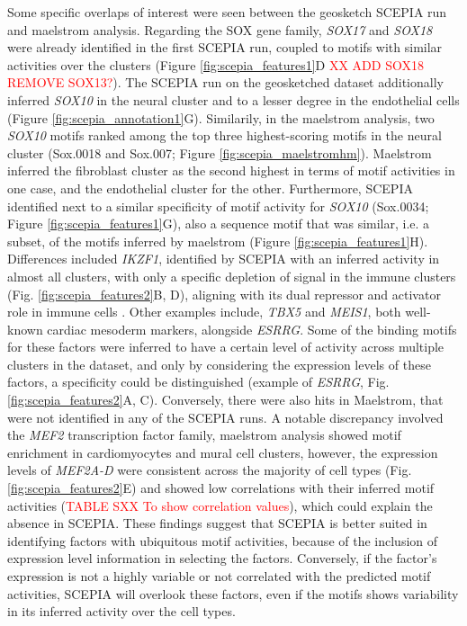 Some specific overlaps of interest were seen between the geosketch SCEPIA run and maelstrom analysis. Regarding the SOX gene family, \textit{SOX17} and \textit{SOX18} were already identified in the first SCEPIA run, coupled to motifs with similar activities over the clusters (Figure \ref{fig:scepia_features1}D \textcolor{red}{XX ADD SOX18 REMOVE SOX13?}). The SCEPIA run on the geosketched dataset additionally inferred \textit{SOX10} in the neural cluster and to a lesser degree in the endothelial cells (Figure \ref{fig:scepia_annotation1}G). Similarily, in the maelstrom analysis, two \textit{SOX10} motifs ranked among the top three highest-scoring motifs in the neural cluster (Sox.0018 and Sox.007; Figure \ref{fig:scepia_maelstromhm}). Maelstrom inferred the fibroblast cluster as the second highest in terms of motif activities in one case, and the endothelial cluster for the other. Furthermore, SCEPIA identified next to a similar specificity of motif activity for \textit{SOX10} (Sox.0034; Figure \ref{fig:scepia_features1}G), also a sequence motif that was similar, i.e. a subset, of the motifs inferred by maelstrom (Figure \ref{fig:scepia_features1}H). Differences included \textit{IKZF1}, identified by SCEPIA with an inferred activity in almost all clusters, with only a specific depletion of signal in the immune clusters (Fig. \ref{fig:scepia_features2}B, D), aligning with its dual repressor and activator role in immune cells \cite{Marke2018}. Other examples include, \textit{TBX5} and \textit{MEIS1}, both well-known cardiac mesoderm markers, alongside \textit{ESRRG}. Some of the binding motifs for these factors were inferred to have a certain level of activity across multiple clusters in the dataset, and only by considering the expression levels of these factors, a specificity could be distinguished (example of \textit{ESRRG}, Fig. \ref{fig:scepia_features2}A, C). Conversely, there were also hits in Maelstrom, that were not identified in any of the SCEPIA runs. A notable discrepancy involved the \textit{MEF2} transcription factor family, maelstrom analysis showed motif enrichment in cardiomyocytes and mural cell clusters, however, the expression levels of \textit{MEF2A-D} were consistent across the majority of cell types (Fig. \ref{fig:scepia_features2}E) and showed low correlations with their inferred motif activities (\textcolor{red}{TABLE SXX To show correlation values}), which could explain the absence in SCEPIA. These findings suggest that SCEPIA is better suited in identifying factors with ubiquitous motif activities, because of the inclusion of expression level information in selecting the factors. Conversely, if the factor's expression is not a highly variable or not correlated with the predicted motif activities, SCEPIA will overlook these factors, even if the motifs shows variability in its inferred activity over the cell types.

